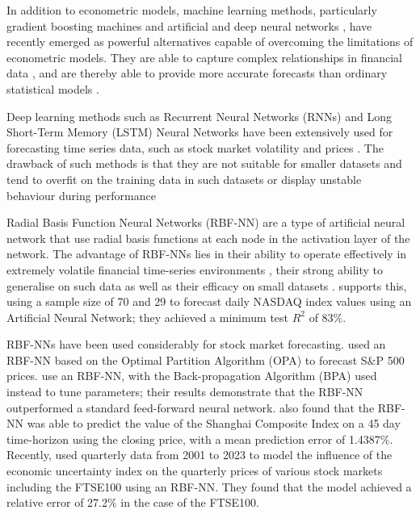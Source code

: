 \documentclass[11pt,a4paper]{article}
\newcommand{\citeboth}[1]{\citeauthor{#1} \citep{#1}}
\begin{document}
In addition to econometric models, machine learning methods, 
particularly gradient boosting machines \citep{gumelar,Liu2024,Chen2023} and artificial and deep neural networks \citep{chen2015lstm,kara2011ann,long2019deep,nelson2017lstm}, have recently emerged as powerful alternatives capable of overcoming the limitations of econometric models. 
They are able to capture complex relationships in financial data \citep{rossi2018ml}, and 
are thereby able to provide more accurate forecasts than ordinary statistical models 
\citep{lapitskaya2021armax}. 


Deep learning methods such as Recurrent Neural Networks (RNNs) and Long Short-Term Memory (LSTM) Neural Networks
have been extensively used for forecasting time series data, 
such as stock market volatility \citep{cho2022forecasting,praveenraj2023} and prices \citep{zhang2022lstm,song2023forecasting,dutta2024hybrid}. The drawback of such 
methods is that they are not suitable for smaller datasets and tend to overfit on the training data
in such datasets \citep{foster1992} or display unstable behaviour during performance \citeboth{lebaron1998}

Radial Basis Function Neural Networks (RBF-NN) are a type of artificial 
neural network that use radial basis functions at each node in the 
activation layer of the network.
The advantage of RBF-NNs lies in their ability to 
operate effectively in extremely volatile financial time-series 
environments \citep{cafferata2019}, their strong ability to 
generalise on such data \citep{sharkawy2020} as well as their efficacy on small datasets \citep{kosarac2022}. 
\citeboth{esfandyari2016}
supports this, using a sample size of 70 and 29 to forecast daily NASDAQ 
index values using an Artificial Neural Network; they achieved a minimum
test $R^2$ of 83$\%$. 

RBF-NNs have been used considerably for stock market forecasting. \citeboth{cao2004} 
used an RBF-NN based on the Optimal Partition Algorithm (OPA) to 
forecast S$\&$P 500 prices. \citeboth{dass2019} use an RBF-NN, with the Back-propagation 
Algorithm (BPA) used instead to tune parameters; their results demonstrate 
that the RBF-NN outperformed a standard feed-forward neural network. 
\citeboth{ji2014} also found that the RBF-NN was able to predict the value 
of the Shanghai Composite Index on a 45 day time-horizon using the closing price, with a mean prediction error of 
1.4387$\%$. Recently, \citeboth{abotaleb2024}
used quarterly data from 2001 to 2023 to model the influence of the economic 
uncertainty index on the quarterly prices of various stock markets including the 
FTSE100 using an RBF-NN. They found that the model 
achieved a relative error of 27.2$\%$ in the case of the FTSE100.
\end{document}

